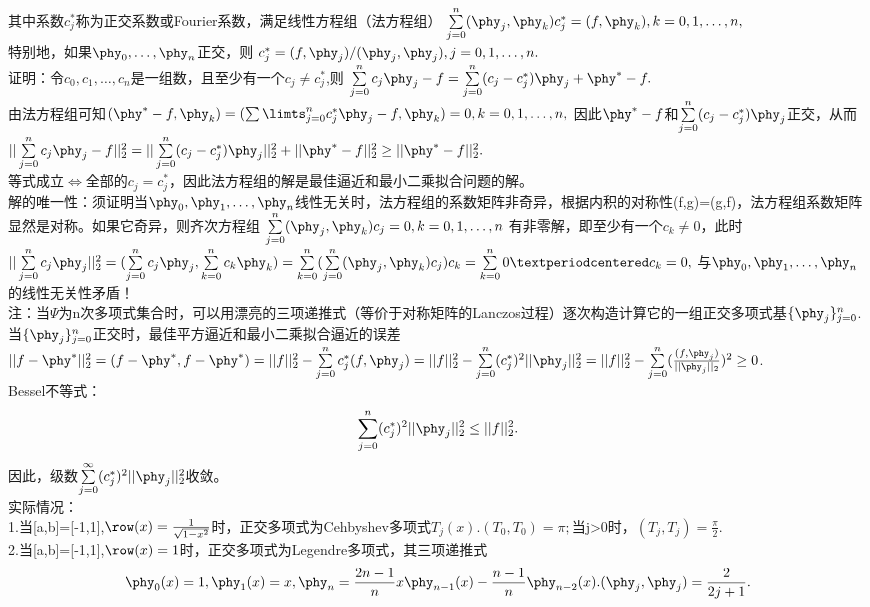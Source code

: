 \documentclass[a4paper,12pt]{article}
\begin{document}
\begin{CJK*}{UTF8}{gbsn}
	其中系数$c_j^*$称为正交系数或Fourier系数，满足线性方程组（法方程组）
	$\sum\limits_{j=0}^n(\phy_j,\phy_k)c_j^*=(f,\phy_k),k=0,1,\ldots,n,$\\
	特别地，如果$\phy_0,\ldots,\phy_n$正交，则
	$c_j^* = (f,\phy_j)/(\phy_j,\phy_j),j=0,1,\ldots,n.$\\
	证明：令$c_0,c_1,\ldots,c_n$是一组数，且至少有一个$c_j\neq c_j^*$,则
	$\sum\limits_{j=0}^nc_j\phy_j-f = \sum\limits_{j=0}^n(c_j-c_j^*)\phy_j + \phy^* -f.$\\
	由法方程组可知$(\phy^*-f,\phy_k)=(\sum\limts_{j=0}^nc_j^*\phy_j-f,\phy_k) = 0,k = 0,1,\ldots,n,$
	因此$\phy^*-f$和$\sum\limits_{j=0}^n(c_j-c_j^*)\phy_j$正交，从而
	$||\sum\limits_{j=0}^nc_j\phy_j-f||_2^2 = ||\sum\limits_{j=0}^n(c_j-c_j^*)\phy_j||_2^2 + ||\phy^*-f||_2^2 \ge ||\phy^*-f||_2^2.$\\
	等式成立$\Leftrightarrow$全部的$c_j=c_j^*$，因此法方程组的解是最佳逼近和最小二乘拟合问题的解。\\
	解的唯一性：须证明当$\phy_0,\phy_1,\ldots,\phy_n$线性无关时，法方程组的系数矩阵非奇异，根据内积的对称性(f,g)=(g,f)，法方程组系数矩阵显然是对称。如果它奇异，则齐次方程组
	$\sum\limits_{j=0}^n(\phy_j,\phy_k)c_j=0,k=0,1,\ldots,n$
	有非零解，即至少有一个$c_k\neq0$，此时
	$||\sum\limits_{j=0}^nc_j\phy_j||_2^2 = (\sum\limits_{j=0}^nc_j\phy_j,\sum\limits_{k=0}^nc_k\phy_k)
	= \sum\limits_{k=0}^n(\sum\limits_{j=0}^n(\phy_j,\phy_k)c_j)c_k
	= \sum\limits_{k=0}^n0·c_k=0,$
	与$\phy_0,\phy_1,\ldots,\phy_n$的线性无关性矛盾！\\
	注：当$\Psi$为n次多项式集合时，可以用漂亮的三项递推式（等价于对称矩阵的Lanczos过程）逐次构造计算它的一组正交多项式基$\{\phy_j\}_{j=0}^n$.\\
	当$\{\phy_j\}_{j=0}^n$正交时，最佳平方逼近和最小二乘拟合逼近的误差
	$||f-\phy^*||_2^2 = (f-\phy^*,f-\phy^*)
	=||f||_2^2-\sum\limits_{j=0}^nc_j^*(f,\phy_j)
	=||f||_2^2 - \sum\limits_{j=0}^n(c_j^*)^2||\phy_j||_2^2
	=||f||_2^2 - \sum\limits_{j=0}^n(\frac{(f,\phy_j)}{||\phy_j||_2})^2\ge 0$.\\
	Bessel不等式：
	\begin{equation}
		\sum\limits_{j=0}^n(c_j^*)^2||\phy_j||_2^2\le ||f||_2^2.
	\end{equation}
	因此，级数$\sum\limits_{j=0}^\infty(c_j^*)^2||\phy_j||_2^2$收敛。\\
	实际情况：\\
	1.当[a,b]=[-1,1],$\row(x)=\frac{1}{\sqrt{1-x^2}}$时，正交多项式为Cehbyshev多项式$T_j(x).(T_0,T_0)=\pi;$当j>0时，$(T_j,T_j)=\frac{\pi}{2}$.\\
	2.当[a,b]=[-1,1],$\row(x)=1$时，正交多项式为Legendre多项式，其三项递推式
	\begin{equation}
		\phy_0(x)=1,\phy_1(x)=x,
		\phy_n=\frac{2n-1}{n}x\phy_{n-1}(x)-\frac{n-1}{n}\phy_{n-2}(x).
		(\phy_j,\phy_j)=\frac{2}{2j+1}.
	\end{equation}


\end{CJK*}
\end{document}
